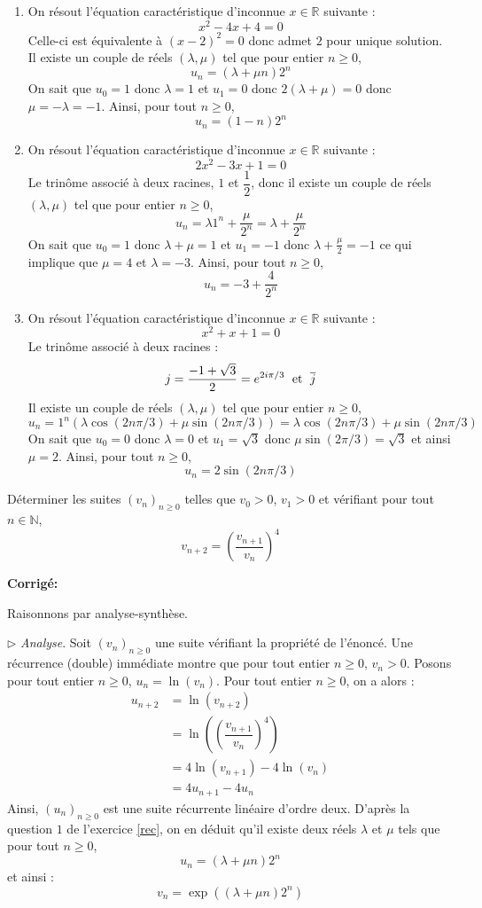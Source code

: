 \documentclass[a4paper,twoside,french,10pt]{VcCours}
\newcommand{\corr}{\textbf{Corrigé:}}
\begin{document}
\begin{enumerate}
\item On résout l'équation caractéristique d'inconnue $x \in \mathbb{R}$ suivante :
$$ x^2-4x+4=0$$
Celle-ci est équivalente à $(x-2)^2=0$ donc admet $2$ pour unique solution. Il existe un couple de réels $(\lambda, \mu)$ tel que pour entier $n \geq 0$,
$$ u_{n} = (\lambda + \mu n) 2^n$$
On sait que $u_0= 1$ donc $\lambda=1$ et $u_1=0$ donc $2(\lambda+\mu)=0$ donc $\mu= - \lambda = -1$. Ainsi, pour tout $n \geq 0$,
$$ u_n = (1-n)2^n$$
\item On résout l'équation caractéristique d'inconnue $x \in \mathbb{R}$ suivante :
$$ 2x^2-3x+1=0$$
Le trinôme associé à deux racines, $1$ et $\dfrac{1}{2}$, donc il existe un couple de réels $(\lambda, \mu)$ tel que pour entier $n \geq 0$,
$$ u_{n} = \lambda 1^n + \dfrac{\mu}{2^n} = \lambda +\dfrac{\mu}{2^n}$$
On sait que $u_0= 1$ donc $\lambda+ \mu=1$ et $u_1=-1$ donc $\lambda+\frac{\mu}{2}=-1$ ce qui implique que $\mu=4$ et $\lambda = -3$. Ainsi, pour tout $n \geq 0$,
$$ u_n =-3 + \dfrac{4}{2^n}$$
\item On résout l'équation caractéristique d'inconnue $x \in \mathbb{R}$ suivante :
$$ x^2+x+1=0$$
Le trinôme associé à deux racines :
$$ j = \dfrac{-1+\sqrt{3}}{2} = e^{2i \pi/3} \; \hbox{ et } \; \overline{j}$$
Il existe un couple de réels $(\lambda, \mu)$ tel que pour entier $n \geq 0$,
$$ u_{n} = 1^n (\lambda \cos(2n \pi/3) + \mu \sin(2n \pi/3)) = \lambda \cos(2n \pi/3) + \mu \sin(2n \pi/3)$$
On sait que $u_0= 0$ donc $\lambda=0$ et $u_1=\sqrt{3}$ donc $\mu \sin(2\pi/3)=\sqrt{3}$ et ainsi $\mu=2$. Ainsi, pour tout $n \geq 0$,
$$ u_n = 2 \sin(2n \pi/3)$$
\end{enumerate}

\medskip


\begin{Exercice}{} Déterminer les suites $(v_n)_{n \geq 0}$ telles que $v_0>0$, $v_1>0$  et vérifiant pour tout $n \in \mathbb{N}$, 
$$v_{n+2}=\left(\dfrac{v_{n+1}}{v_n}\right)^4$$
\end{Exercice}

\corr

Raisonnons par analyse-synthèse. 

\medskip

\noindent $\rhd$ \textit{Analyse}. Soit $(v_n)_{n \geq 0}$ une suite vérifiant la propriété de l'énoncé. Une récurrence (double) immédiate montre que pour tout entier $n \geq 0$, $v_n>0$. Posons pour tout entier $n \geq 0$, $u_n = \ln(v_n)$. Pour tout entier $n \geq 0$, on a alors :
\begin{align*}
u_{n+2} & = \ln(v_{n+2}) \\
& = \ln \left(\left(\dfrac{v_{n+1}}{v_n}\right)^4\right) \\
& = 4 \ln(v_{n+1}) - 4 \ln(v_n) \\
& = 4 u_{n+1} - 4 u_n 
\end{align*}
Ainsi, $(u_n)_{n \geq 0}$ est une suite récurrente linéaire d'ordre deux. D'après la question $1$ de l'exercice \ref{rec}, on en déduit qu'il existe deux réels $\lambda$ et $\mu$ tels que pour tout $n \geq 0$,
$$ u_n = (\lambda+\mu n)2^n$$
et ainsi :
$$ v_n = \exp((\lambda+ \mu n)2^n)$$
\end{document}
